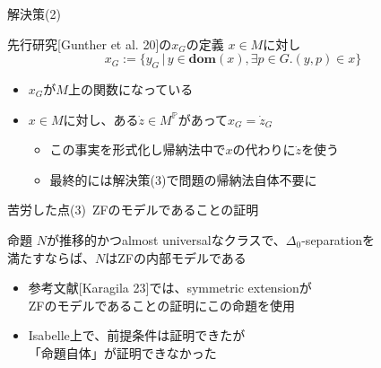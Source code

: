 \documentclass[17pt,aspectratio=169]{beamer}
\newcommand{\Pbb}{\mathbb{P}}
\begin{document}
\begin{frame}{解決策(2)}
    \begin{itembox}[l]{先行研究{\small [Gunther et al. 20]}の$x_G$の定義}
    {\small
        $x \in M$に対し
        \vspace{-5pt}
        $$x_G := \{ y_G \, | \, y \in \bm{\mathbf{dom}}(x), \exists p \in G. (y, p) \in x \}$$
    }
    \end{itembox}
    {\small 
    \begin{itemize}[itemsep=4pt]    
        \item $x_G$が$M$上の関数になっている
        \item $x \in M$に対し、ある$\dot{z} \in M^\Pbb$があって$x_G = \dot{z}_G$
            \vspace{3pt}
              {\small
              \begin{itemize}
                  \item この事実を形式化し帰納法中で$x$の代わりに$\dot{z}$を使う
                  \item 最終的には解決策(3)で問題の帰納法自体不要に
              \end{itemize}}
    \end{itemize}
    }
\end{frame}

\begin{frame}{苦労した点(3)\, {\normalsize ZFのモデルであることの証明}}
    \begin{itembox}[l]{命題}
        {\small
            $N$が推移的かつalmost universalなクラスで、$\Delta_0$-separationを\\
            満たすならば、$N$はZFの内部モデルである
        }
    \end{itembox}
    {\small
    \begin{itemize}[itemsep=8pt]
        \item 参考文献{\small [Karagila 23]}では、symmetric extensionが\\
              ZFのモデルであることの証明にこの命題を使用
        \item Isabelle上で、前提条件は証明できたが\\
              「命題自体」が証明できなかった
        
    \end{itemize}
    }
\end{frame}
\end{document}
